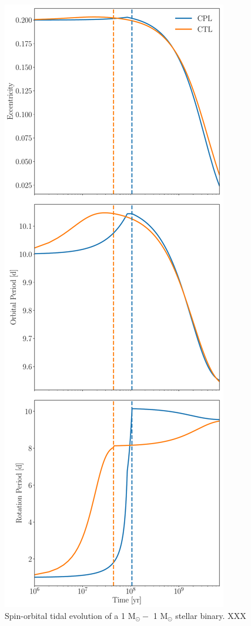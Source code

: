 \documentclass[twocolumn]{aastex61}
\begin{document}
\begin{figure}[h]
	\includegraphics[width=\textwidth]{../Plots/tidalExample.pdf}
   \caption{Spin-orbital tidal evolution of a 1 M$_{\odot} -$ 1 M$_{\odot}$ stellar binary. XXX}%
    \label{fig:tidalExample}%
\end{figure}
\end{document}
